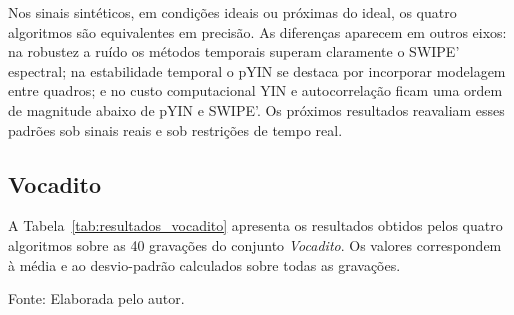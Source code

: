   Nos sinais sintéticos, em condições ideais ou próximas do ideal, os quatro
  algoritmos são equivalentes em precisão. As diferenças aparecem em outros
  eixos: na robustez a ruído os métodos temporais superam claramente o SWIPE'
  espectral; na estabilidade temporal o pYIN se destaca por incorporar
  modelagem entre quadros; e no custo computacional YIN e autocorrelação ficam
  uma ordem de magnitude abaixo de pYIN e SWIPE'. Os próximos resultados
  reavaliam esses padrões sob sinais reais e sob restrições de tempo real.

    \subsection{Vocadito}
  \label{sec:resultados_vocadito}

  A Tabela~\ref{tab:resultados_vocadito} apresenta os resultados obtidos pelos
  quatro algoritmos sobre as 40 gravações do conjunto \textit{Vocadito}. Os
  valores correspondem à média e ao desvio-padrão calculados sobre todas as
  gravações.

  \begin{table}[H]
  \centering
  \caption{\label{tab:resultados_vocadito}Resultados agregados sobre o conjunto \textit{Vocadito}. Os valores são apresentados como média $\pm$ desvio-padrão sobre as 40
  gravações. As setas indicam o sentido desejado: $\uparrow$ maior é melhor; $\downarrow$ menor é melhor.}
  \small Fonte: Elaborada pelo autor.
\end{table}

